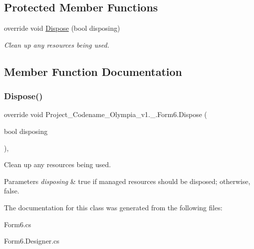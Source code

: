 \subsection*{Protected Member Functions}
\begin{DoxyCompactItemize}
\item 
override void \hyperlink{classProject__Codename__Olympia__v1_1_1__0_1_1Form6_a9136ee056a97f41d8bf4dcd25e203328}{Dispose} (bool disposing)
\begin{DoxyCompactList}\small\item\em Clean up any resources being used. \end{DoxyCompactList}\end{DoxyCompactItemize}


\subsection{Member Function Documentation}
\mbox{\label{classProject__Codename__Olympia__v1_1_1__0_1_1Form6_a9136ee056a97f41d8bf4dcd25e203328}} 
\subsubsection{\texorpdfstring{Dispose()}{Dispose()}}
{\footnotesize\ttfamily override void Project\+\_\+\+Codename\+\_\+\+Olympia\+\_\+v1.\+\_.\+Form6.\+Dispose (\begin{DoxyParamCaption}\item[{bool}]{disposing }\end{DoxyParamCaption})\hspace{0.3cm}{\ttfamily [inline]}, {\ttfamily [protected]}}



Clean up any resources being used. 


\begin{DoxyParams}{Parameters}
{\em disposing} & true if managed resources should be disposed; otherwise, false.\\
\hline
\end{DoxyParams}


The documentation for this class was generated from the following files\+:\begin{DoxyCompactItemize}
\item 
Form6.\+cs\item 
Form6.\+Designer.\+cs\end{DoxyCompactItemize}
